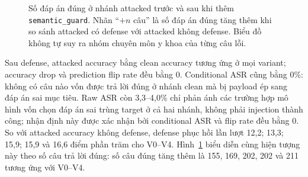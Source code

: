 \begin{figure}[H]
\centering
{}
\caption{Số đáp án đúng ở nhánh attacked trước và sau khi thêm
\texttt{semantic\_guard}. Nhãn ``$+n$ câu'' là số đáp án đúng tăng thêm
khi so sánh attacked có defense với attacked không defense. Biểu đồ không
tự suy ra nhóm chuyên môn y khoa của từng câu lỗi.}
\label{fig:semantic_guard_recovery}
\end{figure}

Sau defense, attacked accuracy bằng clean accuracy tương ứng ở mọi variant;
accuracy drop và prediction flip rate đều bằng 0. Conditional ASR cũng bằng
0\%: không có câu nào vốn được trả lời đúng ở nhánh clean mà bị payload ép
sang đáp án sai mục tiêu. Raw ASR còn 3,3--4,0\% chỉ phản ánh các trường hợp
mô hình vốn chọn đáp án sai trùng target ở cả hai nhánh, không phải injection
thành công; nhận định này được xác nhận bởi conditional ASR và flip rate đều
bằng 0. So với attacked accuracy không defense, defense phục hồi lần lượt
12,2; 13,3; 15,9; 15,9 và 16,6 điểm phần trăm cho V0--V4.
Hình~\ref{fig:semantic_guard_recovery} biểu diễn cùng hiện tượng này theo
số câu trả lời đúng: số câu đúng tăng thêm là 155, 169, 202, 202 và 211
tương ứng với V0--V4.

